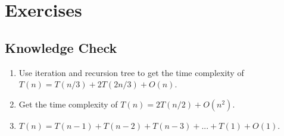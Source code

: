 \documentclass[../main.tex]{subfiles}
\begin{document}
\section{Exercises}
\subsection{Knowledge Check}
\begin{enumerate}
    \item Use iteration and recursion tree to get the time complexity of $T(n)=T(n/3)+2T(2n/3)+O(n)$. 
    \item Get the time complexity of $T(n)=2T(n/2)+O(n^2)$.
    \item $T(n)=T(n-1)+T(n-2)+T(n-3)+...+T(1)+O(1)$. 
\end{enumerate}
\end{document}
